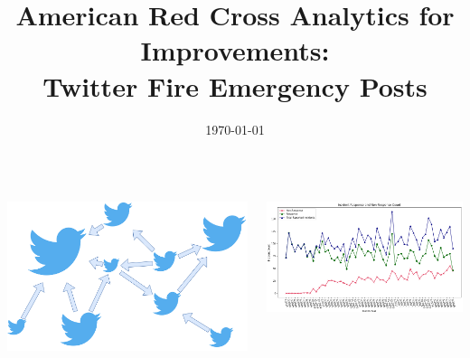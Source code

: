 \documentclass
[
blockverticalspace=-0.8cm
]
{tikzposter}
\title
{
    American Red Cross Analytics for Improvements: \\
    Twitter Fire Emergency Posts
}
\date{\today}
\institute{Illinois Institute of Technology}
\begin{document}
\maketitle


\begin{columns}

    \block{~}
    {
        \vspace{-5cm}
        \vspace{2cm}

        \begin{center}
            \includegraphics[scale=1.4]{twitter-graph.png}
        \end{center}
    }

    \block{~}
    {
        \vspace{-5cm}
        
        \begin{tikzfigure}
            \includegraphics[scale=1.05]{in_response.png}
        \end{tikzfigure}
    }
\end{columns}
\end{document}
